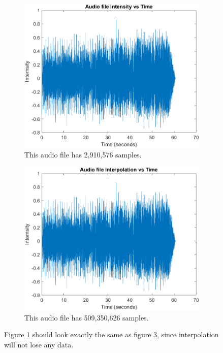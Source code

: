         
    \begin{figure}[H]
        \centering  
        \begin{subfigure}[b]{0.48\textwidth}
            \includegraphics[width=\textwidth]{Images/Audio V Time.png}
            \caption{This audio file has 2,910,576 samples.}
            \label{fig:AudioBeforeInterp}
        \end{subfigure}
        \hfill
        \begin{subfigure}[b]{0.48\textwidth}
            \includegraphics[width=\textwidth]{Images/Audio V Time Interpolated.png}
            \caption{This audio file has 509,350,626 samples.}
            \label{fig:AudioAfterInterp}
        \end{subfigure}
        \caption{Figure \ref{fig:AudioBeforeInterp} should look exactly the same as figure \ref{fig:AudioAfterInterp}, since interpolation will not lose any data.}
    \end{figure}
    
